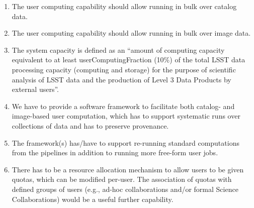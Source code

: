 \begin{enumerate}
\item The user computing capability should allow running in bulk over catalog data.
    \item The user computing capability should allow running in bulk over image data.
    \item The system capacity is defined as an “amount of computing capacity equivalent to at least userComputingFraction (10\%) of the total LSST data processing capacity (computing and storage) for the purpose of scientific analysis of LSST data and the production of Level 3 Data Products by external users”.
    \item We have to provide a software framework to facilitate both catalog- and image-based user computation, which has to support systematic runs over collections of data and has to preserve provenance.
    \item The framework(s) has/have to support re-running standard computations from the pipelines in addition to running more free-form user jobs.
    \item There has to be a resource allocation mechanism to allow users to be given quotas, which can be modified per-user. The association of quotas with defined groups of users (e.g., ad-hoc collaborations and/or formal Science Collaborations) would be a useful further capability.

\end{enumerate}
